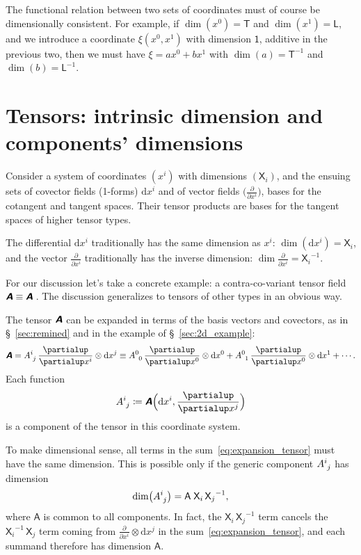 \documentclass[\ifafour a4paper,12pt,\else a5paper,10pt,\fi%
onecolumn,oneside,article,%
british%
]{memoir}
\makeatletter
\theoremstyle{remark}
\theoremstyle{innote}
\newcommand*{\mathte}[1]{\textbf{\textit{\textsf{#1}}}}
\newcommand*{\de}{\partialup}%
\newcommand*{\di}{\mathrm{d}}%
\newcommand*{\defd}{\coloneqq}
\renewcommand*{\|}[1][]{\nonscript\,#1\vert\nonscript\;\mathopen{}}
\newcommand*{\sect}{\S}%
\newcommand*{\q}{}%
\DeclareRobustCommand*{\q}{%
  \mathbin{\mathpalette\bigcdot@{}}%
}
\newcommand*{\bigcdot@scalefactor}{0.7}
\newcommand*{\bigcdot@widthfactor}{1.5}
\newcommand*{\bigcdot@}[2]{%
  \sbox0{$#1\vcenter{}$}%
  \sbox2{$#1\cdot\m@th$}%
  \hbox to \bigcdot@widthfactor\wd2{%
    \hfil
    \raise\ht0\hbox{%
      \scalebox{\bigcdot@scalefactor}{%
        \lower\ht0\hbox{$#1\bullet\m@th$}%
      }%
    }%
    \hfil
  }%
}
\newcommand*{\Un}{\textsf{1}}
\newcommand*{\Le}{\textsf{L}}
\newcommand*{\Ti}{\textsf{T}}
\newcommand*{\Xx}{\textsf{X}}
\newcommand*{\Aa}{\textsf{A}}
\newcommand*{\yA}{\mathte{A}}
\renewcommand*{\i}{\indices}
\newcommand*{\dex}[1][i]{\frac{\de}{\de x^{#1}}}
\newcommand*{\dix}[1][i]{\di x^{#1}}
\makeatother
\begin{document}
The functional relation between two sets of coordinates must of course be
dimensionally consistent. For example, if $\dim(x^{0})=\Ti$ and
$\dim(x^{1})=\Le$, and we introduce a coordinate $\xi(x^{0},x^{1})$ with
dimension $\Un$, additive in the previous two, then we must have
$\xi = a x^{0} + b x^{1}$ with $\dim(a) = \Ti^{-1}$ and
$\dim(b) = \Le^{-1}$.


\section{Tensors: intrinsic dimension and components' dimensions}
\label{sec:tensors}

Consider a system of coordinates $(x^i)$ with dimensions $(\Xx_i)$, and the
ensuing sets of covector fields (1-forms) $\dix$ and of vector fields
$\bigl(\dex\bigr)$, bases for the cotangent and tangent spaces. Their
tensor products are bases for the tangent spaces of higher tensor types.

The differential $\dix$ traditionally has the same dimension as $x^{i}$:
$\dim(\dix) = \Xx_{i}$, and the vector $\dex$ traditionally has the
inverse dimension: $\dim\dex = {\Xx_{i}}^{-1}$. %

For our discussion let's take a concrete example: a contra-co-variant tensor
field $\yA \equiv \yA\i{^{\q}_{\q}}$\,. The discussion generalizes to tensors
of other types in an obvious way.

The tensor $\yA$ can be expanded in terms of the basis vectors and
covectors, as in \sect~\ref{sec:remined} and in the example of
\sect~\ref{sec:2d_example}:
\begin{equation}
  \label{eq:expansion_tensor}
  \yA = A\i{^{i}_{j}}\, \dex\otimes\dix[j]
  \equiv A\i{^{0}_{0}}\,\dex[0]\otimes\dix[0] + 
  A\i{^{0}_{1}}\,\dex[0]\otimes\dix[1] + \dotsb {}.
\end{equation}
Each function
\begin{equation}
  A\i{^{i}_{j}} \defd  \yA\Bigl(\dix, \dex[j]\Bigr)
  \label{eq:components_def}
\end{equation}
is a component of the tensor in this coordinate system.

\medskip

To make dimensional sense, all terms in the sum~\eqref{eq:expansion_tensor}
must have the same dimension. This is possible only if the generic
component $A\i{^{i}_{j}}$ has dimension
\begin{equation}
  \label{eq:dim_component}
  \dim\bigl(A\i{^{i}_{j}}\bigr) = \Aa\;{\Xx_{i}}\,{\Xx_{j}}^{-1},
\end{equation}
where $\Aa$ is common to all components. In fact, the
${\Xx_{i}}\,{\Xx_{j}}^{-1}$ term cancels the ${\Xx_{i}}^{-1}\,{\Xx_{j}}$
term coming from $\dex\otimes\dix[j]$ in the
sum~\eqref{eq:expansion_tensor}, and each summand therefore has dimension
$\Aa$.
\end{document}
